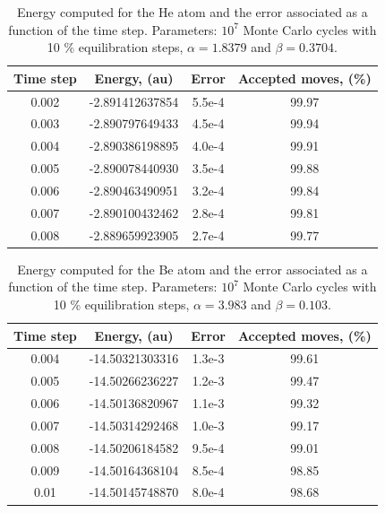 \begin{table}[!hbt]
\centering
\begin{tabular}{cccc}
\toprule[1pt]
\textbf{Time step} & \textbf{Energy}, (au) 	& \textbf{Error} & \textbf{Accepted moves}, (\%) \\
\midrule[1pt]
0.002  & -2.891412637854  &  5.5e-4   &  99.97\\
0.003  & -2.890797649433  &  4.5e-4   &  99.94\\
0.004  & -2.890386198895  &  4.0e-4   &  99.91\\
0.005  & -2.890078440930  &  3.5e-4   &  99.88\\
0.006  & -2.890463490951  &  3.2e-4   &  99.84\\
0.007  & -2.890100432462  &  2.8e-4   &  99.81\\
0.008  & -2.889659923905  &  2.7e-4   &  99.77\\
\bottomrule[1pt]
\end{tabular}\caption{Energy computed for the He atom and the error associated as a function of the time step. Parameters: $10^7$ Monte Carlo cycles with 10 \% equilibration steps, $\alpha =  1.8379$ and $\beta = 0.3704$.}\label{blockingDtTableHe}
\end{table}




\begin{table}[!hbt]
\centering
\begin{tabular}{cccc}
\toprule[1pt]
\textbf{Time step} & \textbf{Energy}, (au) 	& \textbf{Error} & \textbf{Accepted moves}, (\%) \\
\midrule[1pt]
0.004  & 	-14.50321303316  &  1.3e-3  &   99.61\\
0.005  & 	-14.50266236227  &  1.2e-3  &   99.47\\
0.006  & 	-14.50136820967  &  1.1e-3  &   99.32\\
0.007  & 	-14.50314292468  &  1.0e-3  &   99.17\\
0.008  & 	-14.50206184582  &  9.5e-4  &   99.01\\
0.009  & 	-14.50164368104  &  8.5e-4  &   98.85\\
0.01   & 	-14.50145748870  &  8.0e-4  &   98.68\\
\bottomrule[1pt]
\end{tabular}\caption{Energy computed for the Be atom and the error associated as a function of the time step. Parameters: $10^7$ Monte Carlo cycles with 10 \% equilibration steps, $\alpha = 3.983$ and $\beta = 0.103$.}\label{blockingDtTableBe}
\end{table}


